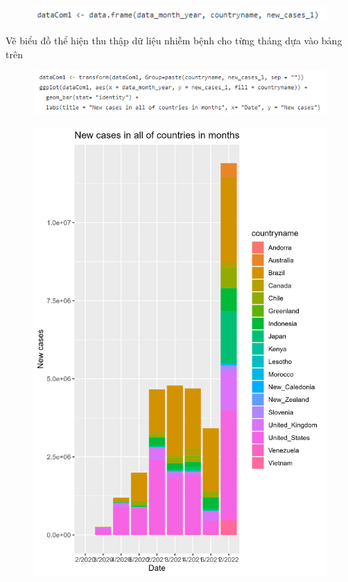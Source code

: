 \documentclass[a4paper]{article}
\theoremstyle{definition}
\begin{document}
\begin{enumerate}[i)]
\begin{enumerate}[1]
\begin{figure}[H]
				\centering
				\includegraphics{images/7.0.4.png}
			\end{figure}
			Vẽ biểu đồ thể hiện thu thập dữ liệu nhiễm bệnh cho từng tháng dựa vào bảng trên
			\begin{figure}[H]
				\centering
				\includegraphics{images/7.0.5.png}
			\end{figure}
			\begin{figure}[H]
				\centering
				\includegraphics[scale=0.2]{images/7.1.png}

\end{figure}
\end{enumerate}
\end{enumerate}
\end{document}
